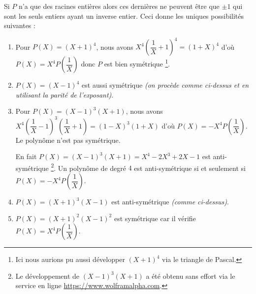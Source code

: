 Si $P$ n'a que des racines entières alors ces dernières ne peuvent être que $\pm 1$ qui sont les seuls entiers ayant un inverse entier. Ceci donne les uniques  possibilités suivantes :

\begin{enumerate}
	\item Pour $P(X) = (X + 1)^4$, nous avons
	      $X^4 \left( \dfrac1X + 1\right)^4 = (1 + X)^4$ 
	      d'où
	      $P(X) = X^4 P\left( \dfrac1X \right)$
	      donc $P$ est bien symétrique
	      \footnote{
	      	Ici nous aurions pu aussi développer $(X + 1)^4$ via le triangle de Pascal.
		  }.

	\item $P(X) = (X - 1)^4$ est aussi symétrique \emph{(on procède comme ci-dessus et en utilisant la parité de l'exposant)}.
	
	\item Pour $P(X) = (X - 1)^3 (X + 1)$, nous avons
	      $X^4 \left( \dfrac1X - 1\right)^3 \left( \dfrac1X + 1\right)
	      = (1 - X)^3 (1 + X)$
	      d'où
	      $P(X) = - X^4 P\left( \dfrac1X \right)$.
	      Le polynôme n'est pas symétrique.

	      \noindent En fait $P(X) = (X - 1)^3 (X + 1) = X^4 - 2 X^3 + 2 X - 1$ est anti-symétrique
	      \footnote{
	      	Le développement de $(X - 1)^3 (X + 1)$ a été obtenu sans effort via le service en ligne \url{https://www.wolframalpha.com}.
		  }. 
	      Un polynôme de degré $4$ est anti-symétrique si et seulement si  $P(X) = - X^4 P\left( \dfrac1X \right)$.
	
	\item $P(X) = (X + 1)^3 (X - 1)$ est anti-symétrique \emph{(comme ci-dessus)}.

	\item $P(X) = (X + 1)^2 (X - 1)^2$ est symétrique car il vérifie $P(X) = X^4 P\left( \dfrac1X \right)$.
\end{enumerate}



